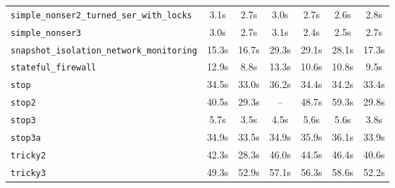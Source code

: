 \begin{tabular}{lcccccc}
\texttt{simple_nonser2_turned_ser_with_locks} & 3.1s & 2.7s & 3.0s & 2.7s & 2.6s & 2.8s \\
\texttt{simple_nonser3} & 3.0s & 2.7s & 3.1s & 2.4s & 2.5s & 2.7s \\
\texttt{snapshot_isolation_network_monitoring} & 15.3s & 16.7s & 29.3s & 29.1s & 28.1s & 17.3s \\
\texttt{stateful_firewall} & 12.9s & 8.8s & 13.3s & 10.6s & 10.8s & 9.5s \\
\texttt{stop} & 34.5s & 33.0s & 36.2s & 34.4s & 34.2s & 33.4s \\
\texttt{stop2} & 40.5s & 29.3s & -- & 48.7s & 59.3s & 29.8s \\
\texttt{stop3} & 5.7s & 3.5s & 4.5s & 5.6s & 5.6s & 3.8s \\
\texttt{stop3a} & 34.9s & 33.5s & 34.9s & 35.9s & 36.1s & 33.9s \\
\texttt{tricky2} & 42.3s & 28.3s & 46.0s & 44.5s & 46.4s & 40.6s \\
\texttt{tricky3} & 49.3s & 52.9s & 57.1s & 56.3s & 58.6s & 52.2s \\
\bottomrule
\end{tabular}

